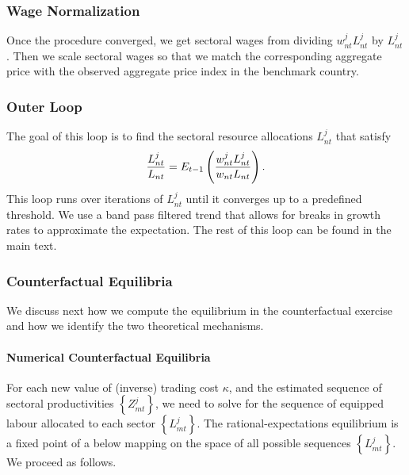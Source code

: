 \documentclass[12pt]{article}
\begin{document}
\subsubsection{Wage Normalization}

Once the procedure converged, we get sectoral wages from dividing $w_{nt}^j
L_{nt}^j$ by $L_{nt}^j$. Then we scale sectoral wages so that we match the
corresponding aggregate price with the observed aggregate price index in the
benchmark country.

\subsubsection{Outer Loop}

The goal of this loop is to find the sectoral resource allocations $%
L_{nt}^{j}$ that satisfy 
\begin{equation*}
\frac{L_{nt}^{j}}{L_{nt}}=E_{t-1}\left( \frac{w_{nt}^{j}L_{nt}^{j}}{%
w_{nt}L_{nt}}\right) .
\end{equation*}%
This loop runs over iterations of $L_{nt}^{j}$ until it converges up to a
predefined threshold. We use a band pass filtered trend that allows for
breaks in growth rates to approximate the expectation. The rest of this loop
can be found in the main text.

\subsubsection{Counterfactual Equilibria}

We discuss next how we compute the equilibrium in the counterfactual
exercise and how we identify the two theoretical mechanisms.

\paragraph{Numerical Counterfactual Equilibria}

For each new value of (inverse) trading cost $\kappa $, and the estimated
sequence of sectoral productivities $\left\{ Z_{mt}^{j}\right\} $, we need
to solve for the sequence of equipped labour allocated to each sector $%
\left\{ L_{mt}^{j}\right\} $. The rational-expectations equilibrium is a
fixed point of a below mapping on the space of all possible sequences $%
\left\{ L_{mt}^{j}\right\} $. We proceed as follows.
\end{document}

